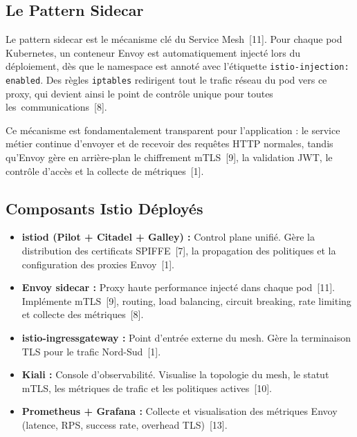 \subsection{Le Pattern Sidecar}

Le pattern sidecar est le mécanisme clé du Service Mesh~[11]. Pour chaque pod
Kubernetes, un conteneur Envoy est automatiquement injecté lors du déploiement, dès que le namespace est annoté avec l'étiquette \texttt{istio-injection: enabled}.
Des règles \texttt{iptables} redirigent tout le trafic réseau du pod vers ce proxy, qui devient ainsi le point de contrôle unique pour toutes les~communications~[8].

Ce mécanisme est fondamentalement transparent pour l'application : le service
métier continue d'envoyer et de recevoir des requêtes HTTP normales, tandis
qu'Envoy gère en arrière-plan le chiffrement mTLS~[9], la validation JWT, le
contrôle d'accès et la collecte de métriques~[1].

\subsection{Composants Istio Déployés}

\begin{itemize}[topsep=4pt, itemsep=3pt]
  \item \textbf{istiod (Pilot + Citadel + Galley) :} Control plane unifié. Gère
        la distribution des certificats SPIFFE~[7], la propagation des politiques
        et la configuration des proxies Envoy~[1].

  \item \textbf{Envoy sidecar :} Proxy haute performance injecté dans chaque
        pod~[11]. Implémente mTLS~[9], routing, load balancing, circuit breaking,
        rate limiting et collecte des métriques~[8].

  \item \textbf{istio-ingressgateway :} Point d'entrée externe du mesh. Gère la
        terminaison TLS pour le trafic Nord-Sud~[1].

  \item \textbf{Kiali :} Console d'observabilité. Visualise la topologie du mesh,
        le statut mTLS, les métriques de trafic et les politiques actives~[10].

  \item \textbf{Prometheus + Grafana :} Collecte et visualisation des métriques
        Envoy (latence, RPS, success rate, overhead TLS)~[13].
\end{itemize}

